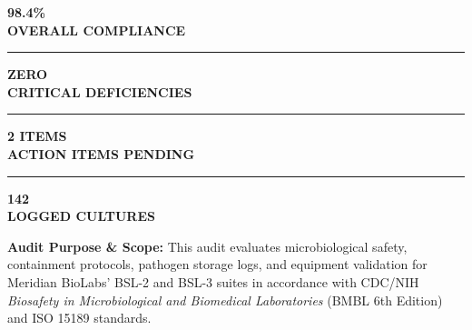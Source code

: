 \documentclass[10pt,a4paper]{scrartcl}
\begin{document}
\begin{tcolorbox}[summarycard]
\begin{minipage}[c]{0.22\textwidth}
    \centering
    \textcolor{TealDark}{\Large\bfseries 98.4\%}\\[1pt]
    \textcolor{SlateDark}{\scriptsize\bfseries OVERALL COMPLIANCE}
\end{minipage}%
\begin{minipage}[c]{0.01\textwidth}
    \color{BorderGray}\rule{0.4pt}{24pt}
\end{minipage}%
\begin{minipage}[c]{0.25\textwidth}
    \centering
    \textcolor{AlertGreen}{\Large\bfseries ZERO}\\[1pt]
    \textcolor{SlateDark}{\scriptsize\bfseries CRITICAL DEFICIENCIES}
\end{minipage}%
\begin{minipage}[c]{0.01\textwidth}
    \color{BorderGray}\rule{0.4pt}{24pt}
\end{minipage}%
\begin{minipage}[c]{0.25\textwidth}
    \centering
    \textcolor{AlertAmber}{\Large\bfseries 2 ITEMS}\\[1pt]
    \textcolor{SlateDark}{\scriptsize\bfseries ACTION ITEMS PENDING}
\end{minipage}%
\begin{minipage}[c]{0.01\textwidth}
    \color{BorderGray}\rule{0.4pt}{24pt}
\end{minipage}%
\begin{minipage}[c]{0.25\textwidth}
    \centering
    \textcolor{NavyPrimary}{\Large\bfseries 142}\\[1pt]
    \textcolor{SlateDark}{\scriptsize\bfseries LOGGED CULTURES}
\end{minipage}
\end{tcolorbox}

\vspace{-2pt}

{\small\textcolor{SlateDark}{\textbf{Audit Purpose \& Scope:} This audit evaluates microbiological safety, containment protocols, pathogen storage logs, and equipment validation for Meridian BioLabs' BSL-2 and BSL-3 suites in accordance with CDC/NIH \textit{Biosafety in Microbiological and Biomedical Laboratories} (BMBL 6th Edition) and ISO 15189 standards.}}
\end{document}

